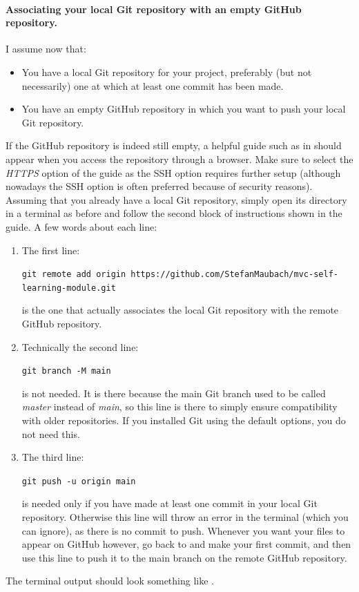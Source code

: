 \documentclass[a4paper,10pt]{article}
\begin{document}
\paragraph{Associating your local Git repository with an empty GitHub repository.} I assume now that:
\begin{itemize}
    \item You have a local Git repository for your project, preferably (but not necessarily) one at which at least one commit has been made.
    \item You have an empty GitHub repository in which you want to push your local Git repository.
\end{itemize}
If the GitHub repository is indeed still empty, a helpful guide such as in  should appear when you access the repository through a browser. Make sure to select the \emph{HTTPS} option of the guide as the SSH option requires further setup (although nowadays the SSH option is often preferred because of security reasons). Assuming that you already have a local Git repository, simply open its directory in a terminal as before and follow the second block of instructions shown in the guide. A few words about each line:
\begin{enumerate}
    \item The first line:

    \texttt{git remote add origin https://github.com/StefanMaubach/mvc-self-learning-module.git}
    
    is the one that actually associates the local Git repository with the remote GitHub repository.
    
    \item Technically the second line:
    
    \texttt{git branch -M main}
    
    is not needed. It is there because the main Git branch used to be called \emph{master} instead of \emph{main}, so this line is there to simply ensure compatibility with older repositories. If you installed Git using the default options, you do not need this.

    \item The third line:

    \texttt{git push -u origin main}

    is needed only if you have made at least one commit in your local Git repository. Otherwise this line will throw an error in the terminal (which you can ignore), as there is no commit to push. Whenever you want your files to appear on GitHub however, go back to  and make your first commit, and then use this line to push it to the main branch on the remote GitHub repository.
\end{enumerate}
The terminal output should look something like .
\end{document}
